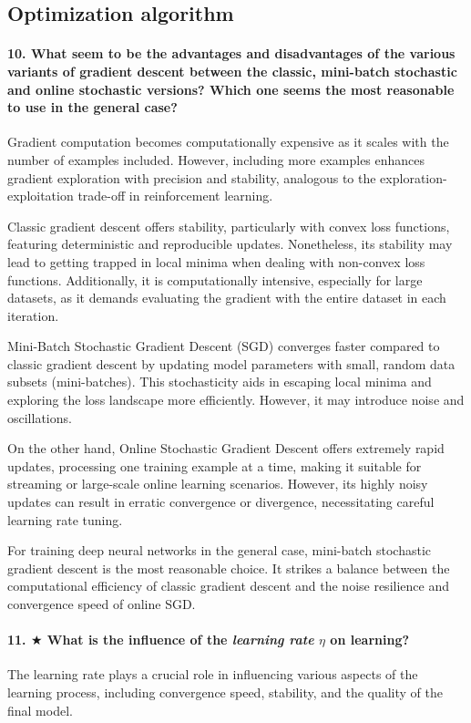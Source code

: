 \subsection{Optimization algorithm}
\paragraph{10. What seem to be the advantages and disadvantages of the various variants of gradient descent between the classic, mini-batch stochastic and online stochastic versions? Which one seems the most reasonable to use in the general case?}
Gradient computation becomes computationally expensive as it scales with the number of examples included. However, including more examples enhances gradient exploration with precision and stability, analogous to the exploration-exploitation trade-off in reinforcement learning.

Classic gradient descent offers stability, particularly with convex loss functions, featuring deterministic and reproducible updates. Nonetheless, its stability may lead to getting trapped in local minima when dealing with non-convex loss functions. Additionally, it is computationally intensive, especially for large datasets, as it demands evaluating the gradient with the entire dataset in each iteration.

Mini-Batch Stochastic Gradient Descent (SGD) converges faster compared to classic gradient descent by updating model parameters with small, random data subsets (mini-batches). This stochasticity aids in escaping local minima and exploring the loss landscape more efficiently. However, it may introduce noise and oscillations.

On the other hand, Online Stochastic Gradient Descent offers extremely rapid updates, processing one training example at a time, making it suitable for streaming or large-scale online learning scenarios. However, its highly noisy updates can result in erratic convergence or divergence, necessitating careful learning rate tuning.

For training deep neural networks in the general case, mini-batch stochastic gradient descent is the most reasonable choice. It strikes a balance between the computational efficiency of classic gradient descent and the noise resilience and convergence speed of online SGD.

\paragraph{11. $\bigstar$ What is the influence of the \textit{learning rate} $\eta$  on learning?}
The learning rate plays a crucial role in influencing various aspects of the learning process, including convergence speed, stability, and the quality of the final model.

